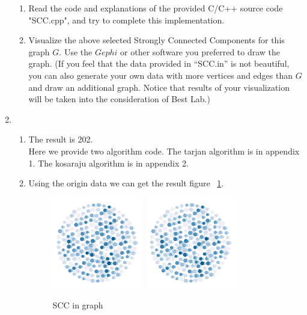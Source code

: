 \documentclass[12pt,a4paper]{article}
\makeatletter
\newtheorem*{solution}{Solution}
\theoremstyle{definition}
\renewenvironment{solution}[1][Solution] {\par\pushQED{\qed}\normalfont\topsep6\p@\@plus6\p@\relax\trivlist\item[\hskip\labelsep\bfseries#1\@addpunct{.}]\ignorespaces}{\popQED\endtrivlist\@endpefalse} \makeatother
\makeatother
\begin{document}
\begin{enumerate}
    \begin{enumerate}
    	\item Read the code and explanations of the provided C/C++ source code "SCC.cpp", and try to complete this implementation.
    	\item Visualize the above selected Strongly Connected Components for this graph $G$. Use the $Gephi$ or other software you preferred to draw the graph. {\color{blue}(If you feel that the data provided in ``SCC.in'' is not beautiful, you can also generate your own data with more vertices and edges than $G$ and draw an additional graph. Notice that results of your visualization will be taken into the consideration of Best Lab.)}
    \end{enumerate}	
    \begin{solution}
    ~\par
    \begin{enumerate}
        \item The result is 202.\\
        Here we provide two algorithm code. The tarjan algorithm is in appendix 1. The kosaraju algorithm is in appendix 2.
        \item Using the origin data we can get the result figure ~\ref{result1}.
        \begin{figure}[htbp]
        \centering
        \includegraphics[width=0.4\textwidth]{result.png}
        \includegraphics[width=0.4\textwidth]{result_curve.png}
        \caption{SCC in graph}\label{result1}

\end{figure}
\end{enumerate}
\end{solution}
\end{enumerate}
\end{document}
